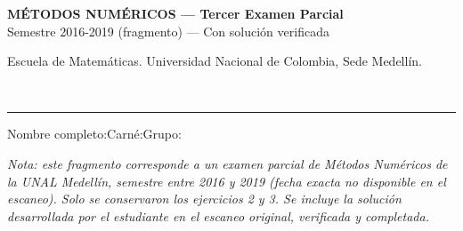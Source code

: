 \documentclass[11pt]{article}
\newcommand{\examheader}{%
  \noindent
  \begin{minipage}[t]{0.6\linewidth}
    {\small\bfseries MÉTODOS NUMÉRICOS --- Tercer Examen Parcial}\\
    {\small Semestre 2016-2019 (fragmento) --- Con solución verificada}
  \end{minipage}%
  \hfill
  \begin{minipage}[t]{0.35\linewidth}
    \raggedleft\small Escuela de Matemáticas. Universidad Nacional de Colombia, Sede Medellín.
  \end{minipage}\\[2pt]
  \rule{\linewidth}{0.6pt}
}
\begin{document}
\examheader

\vspace{4pt}
\noindent Nombre completo:\underline{\hspace{7.5cm}}\quad Carné:\underline{\hspace{2.5cm}}\quad Grupo:\underline{\hspace{1.5cm}}

\vspace{6pt}
\noindent\textit{Nota: este fragmento corresponde a un examen parcial de Métodos Numéricos de la UNAL Medellín, semestre entre 2016 y 2019 (fecha exacta no disponible en el escaneo). Solo se conservaron los ejercicios 2 y 3. Se incluye la solución desarrollada por el estudiante en el escaneo original, verificada y completada.}

\vspace{10pt}
\end{document}
